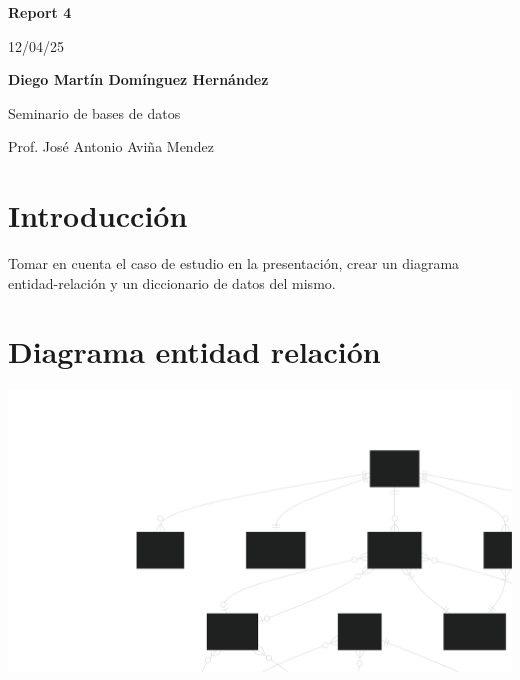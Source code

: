 \documentclass[12pt, a4paper]{article}
\begin{document}
\begin{titlepage}
\end{titlepage}

\begin{titlepage}
\begin{center}
 {\Huge\bfseries Report 4\\}
 \vspace{1cm}

 {\huge 12/04/25\\}
 \vspace{2cm}

 {\Large\bfseries Diego Martín Domínguez Hernández}\\[5pt]
 \vspace{2cm}

 {\Large Seminario de bases de datos}\\[5pt]
 \vspace{2cm}

 {\Large Prof. José Antonio Aviña Mendez}\\[5pt]
\end{center}
\end{titlepage}

\section{Introducción}
Tomar en cuenta el caso de estudio en la presentación, crear un diagrama
entidad-relación y un diccionario de datos del mismo.

\newpage
\tableofcontents
\newpage

\section{Diagrama entidad relación}
\includegraphics[width=\textwidth]{er}
\newpage
\end{document}
